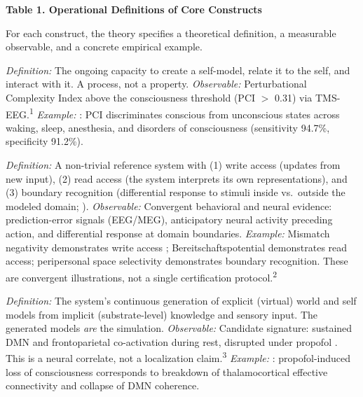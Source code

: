 \documentclass[12pt]{article}
\begin{document}
\noindent\textbf{Table 1. Operational Definitions of Core Constructs}

\medskip
\noindent For each construct, the theory specifies a theoretical definition, a measurable observable, and a concrete empirical example.

\begin{description}[leftmargin=0pt,labelindent=0pt,itemsep=0.8em]

\item[\textsc{Consciousness}] \emph{Definition:} The ongoing capacity to create a self-model, relate it to the self, and interact with it. A process, not a property. \emph{Observable:} Perturbational Complexity Index above the consciousness threshold (PCI $>$ 0.31) via TMS-EEG.\textsuperscript{1} \emph{Example:} \citet{Casarotto2016}: PCI discriminates conscious from unconscious states across waking, sleep, anesthesia, and disorders of consciousness (sensitivity 94.7\%, specificity 91.2\%).

\item[\textsc{Model}] \emph{Definition:} A non-trivial reference system with (1) write access (updates from new input), (2) read access (the system interprets its own representations), and (3) boundary recognition (differential response to stimuli inside vs.\ outside the modeled domain; \citealp{Gruber2015}). \emph{Observable:} Convergent behavioral and neural evidence: prediction-error signals (EEG/MEG), anticipatory neural activity preceding action, and differential response at domain boundaries. \emph{Example:} Mismatch negativity demonstrates write access \citep{Naatanen2007}; Bereitschaftspotential demonstrates read access; peripersonal space selectivity demonstrates boundary recognition. These are convergent illustrations, not a single certification protocol.\textsuperscript{2}

\item[\textsc{Self-simulation}] \emph{Definition:} The system's continuous generation of explicit (virtual) world and self models from implicit (substrate-level) knowledge and sensory input. The generated models \emph{are} the simulation. \emph{Observable:} Candidate signature: sustained DMN and frontoparietal co-activation during rest, disrupted under propofol \citep{Raichle2001}. This is a neural correlate, not a localization claim.\textsuperscript{3} \emph{Example:} \citet{Boly2012}: propofol-induced loss of consciousness corresponds to breakdown of thalamocortical effective connectivity and collapse of DMN coherence.


\end{description}
\end{document}
